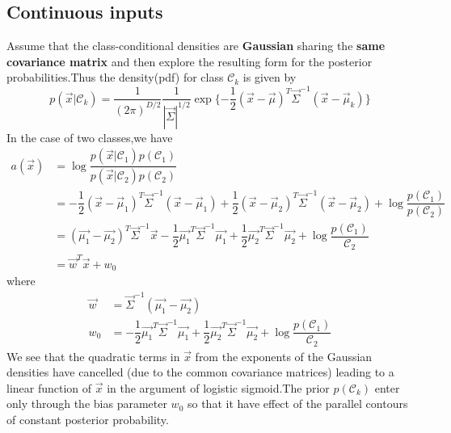 \subsection{Continuous inputs}
Assume that the class-conditional densities are \textbf{Gaussian} sharing the \textbf{same covariance matrix} and then explore the resulting form for the posterior probabilities.Thus the density(pdf) for class $\mathcal{C}_k$ is given by
\begin{equation}
p(\vec{x}|\mathcal{C}_k) = \dfrac{1}{(2\pi)^{D/2}}\dfrac{1}{|\vec{\Sigma}|^{1/2}}
\exp\{-\dfrac{1}{2}(\vec{x}-\vec{\mu})^T\vec{\Sigma}^{-1}(\vec{x}-\vec{\mu}_k)  \}
\end{equation}
In the case of two classes,we have
\begin{align}
a(\vec{x}) &= \log\dfrac{p(\vec{x}|\mathcal{C}_1)p(\mathcal{C}_1)}
{p(\vec{x}|\mathcal{C}_2)p(\mathcal{C}_2)} \\
&=-\dfrac{1}{2}(\vec{x}-\vec{\mu}_1)^T\vec{\Sigma}^{-1}(\vec{x}-\vec{\mu}_1) +
\dfrac{1}{2}(\vec{x}-\vec{\mu}_2)^T\vec{\Sigma}^{-1}(\vec{x}-\vec{\mu}_2) + \log\dfrac{p(\mathcal{C}_1)}{p(\mathcal{C}_2)} \\
&=(\vec{\mu_1}-\vec{\mu_2})^T\vec{\Sigma}^{-1}\vec{x}-
\dfrac{1}{2}\vec{\mu_1}^T\vec{\Sigma}^{-1}\vec{\mu_1} +
\dfrac{1}{2}\vec{\mu_2}^T\vec{\Sigma}^{-1}\vec{\mu_2} + \log\dfrac{p(\mathcal{C}_1)}{\mathcal{C}_2} \\
&=\vec{w}^T\vec{x}+w_0
\end{align}
where
\begin{align}
\vec{w} &= \vec{\Sigma}^{-1}(\vec{\mu_1}-\vec{\mu_2}) \\
w_0 &=  -\dfrac{1}{2}\vec{\mu_1}^T\vec{\Sigma}^{-1}\vec{\mu_1} +
\dfrac{1}{2}\vec{\mu_2}^T\vec{\Sigma}^{-1}\vec{\mu_2} + \log\dfrac{p(\mathcal{C}_1)}{\mathcal{C}_2}
\end{align}
We see that the quadratic terms in $\vec{x}$ from the exponents of the Gaussian densities have cancelled (due to the common covariance matrices) leading to a linear function of $\vec{x}$ in the argument of logistic sigmoid.The prior $p(\mathcal{C}_k)$ enter only through the bias parameter $w_0$ so that it have effect of the parallel contours of constant posterior probability.

